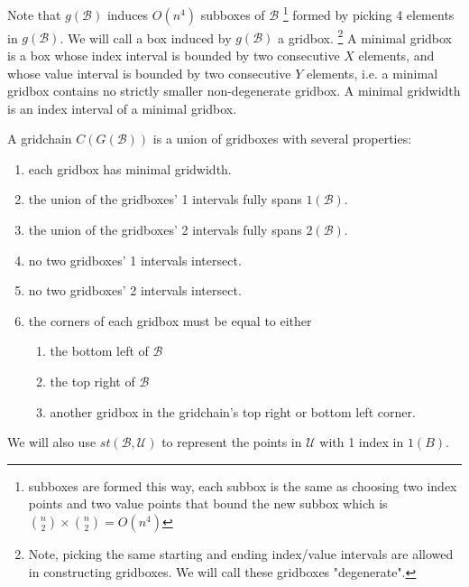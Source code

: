 \documentclass[11pt]{article}
\theoremstyle{definition}
\theoremstyle{remark}
\newcommand{\B}{\mathcal{B}}
\newcommand{\U}{\mathcal{U}}
\begin{document}
Note that \(g(\B)\) induces \(O(n^4) \) subboxes of \(\B\) \footnote{subboxes are formed this way, each subbox is the same as choosing two index points and two value points that bound the new subbox which is \({n\choose 2}\times {n\choose 2}=O(n^4)\)} formed by picking 4 elements in \(g(\B)\). We will call a box induced by \(g(\B)\) a gridbox. \footnote{Note, picking the same starting and ending index/value intervals are allowed in constructing gridboxes. We will call these gridboxes "degenerate".}
A minimal gridbox is a box whose index interval is bounded by two consecutive \(X\) elements, and whose value interval is bounded by two consecutive \(Y\) elements,
i.e. a minimal gridbox contains no strictly smaller non-degenerate gridbox. A minimal gridwidth is an index interval of a minimal gridbox.

A gridchain \(C(G(\B))\) is a union of gridboxes with several properties:
\begin{enumerate}
  \item each gridbox has minimal gridwidth.
  \item the union of the gridboxes' 1 intervals fully spans \(1(\B)\).
  \item the union of the gridboxes' 2 intervals fully spans \(2(\B)\).
  \item no two gridboxes' 1 intervals intersect.
  \item no two gridboxes' 2 intervals intersect.
  \item the corners of each gridbox must be equal to either
    \begin{enumerate}
      \item the bottom left of \(\B\)
      \item the top right of \(\B\)
      \item another gridbox in the gridchain's top right or bottom left corner.
    \end{enumerate}
\end{enumerate}

We will also use \(st(\B,\U)\) to represent the points in \(\U\) with 1 index in \(1(B)\).
\end{document}
